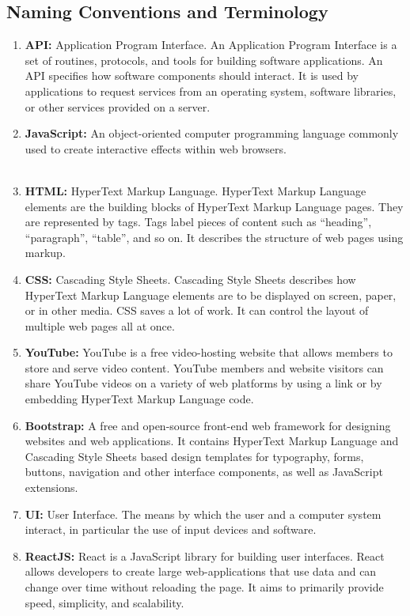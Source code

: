 \documentclass[12pt, titlepage]{article}
\begin{document}
\subsection{Naming Conventions and Terminology}
\begin{enumerate}
  \item \textbf{API:} Application Program Interface. An Application Program Interface is a set of routines, protocols, and tools for building software applications. An API specifies how software components should interact. It is used by applications to request services from an operating system, software libraries, or other services provided on a server.
  \item \textbf{JavaScript:} An object-oriented computer programming language commonly used to create interactive effects within web browsers.
  \\\\
  \item \textbf{HTML:} HyperText Markup Language. HyperText Markup Language elements are the building blocks of HyperText Markup Language pages. They are represented by tags. Tags label pieces of content such as “heading”, “paragraph”, “table”, and so on. It describes the structure of web pages using markup.
  \item \textbf{CSS:} Cascading Style Sheets. Cascading Style Sheets describes how HyperText Markup Language elements are to be displayed on screen, paper, or in other media. CSS saves a lot of work. It can control the layout of multiple web pages all at once.
  \item \textbf{YouTube:} YouTube is a free video-hosting website that allows members to store and serve video content. YouTube members and website visitors can share YouTube videos on a variety of web platforms by using a link or by embedding HyperText Markup Language code.
   \item \textbf{Bootstrap:} A free and open-source front-end web framework for designing websites and web applications. It contains HyperText Markup Language and Cascading Style Sheets based design templates for typography, forms, buttons, navigation and other interface components, as well as JavaScript extensions.
  \item \textbf{UI:} User Interface. The means by which the user and a computer system interact, in particular the use of input devices and software.
  \item \textbf{ReactJS:} React is a JavaScript library for building user interfaces. React allows developers to create large web-applications that use data and can change over time without reloading the page. It aims to primarily provide speed, simplicity, and scalability.
\end{enumerate}
\end{document}
